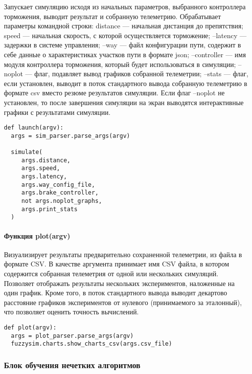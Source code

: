 Запускает симуляцию исходя из начальных параметров, выбранного контроллера торможения, выводит результат и собранную телеметрию. Обрабатывает параметры командной строки: distance — начальная дистанция до препятствия; speed — начальная скорость, с которой осуществляется торможение; --latency — задержки в системе управления; --way — файл конфигурации пути, содержит в себе данные о характеристиках участков пути в формате json; --controller — имя модуля контроллера торможения, который будет использоваться в симуляции; --noplot — флаг, подавляет вывод графиков собранной телеметрии; --stats — флаг, если установлен, выводит в поток стандартного вывода собранную телеметрию в формате csv вместо резюме результатов  симуляции. Если флаг --noplot не установлен, то после завершения симуляции на экран выводятся интерактивные графики с результатами симуляции.

\begin{lstlisting}[style=pythonstyle,caption={}, label=lst:func:1]
def launch(argv):
  args = sim_parser.parse_args(argv)

  simulate(
     args.distance,
     args.speed,
     args.latency,
     args.way_config_file,
     args.brake_controller,
     not args.noplot_graphs,
     args.print_stats
  )
\end{lstlisting}

\paragraph{ Функция plot(argv)}

Визуализирует результаты предварительно сохраненной телеметрии, из файла в формате CSV. В качестве аргумента принимает имя CSV файла, в котором содержится собранная телеметрия от одной или нескольких симуляций. Позволяет отображать результаты нескольких экспериментов, наложенные на один график. Кроме того, в поток стандартного вывода выводит декартово расстояние графиков экспериментов от нулевого (принимаемого за эталонный), что позволяет оценить точность вычислений.

\begin{lstlisting}[style=pythonstyle,caption={  }, label=lst:func:1]
def plot(argv):
  args = plot_parser.parse_args(argv)
  fuzzysim.charts.show_charts_csv(args.csv_file)
\end{lstlisting}


\subsubsection{Блок обучения нечетких алгоритмов }

